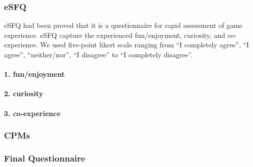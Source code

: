 \subsubsection{eSFQ}
eSFQ\cite{eSFQ} had been proved that it is a questionnaire for rapid assessment of game experience. eSFQ capture the experienced fun/enjoyment, curiosity, and co-experience. We used five-point likert scale ranging from ``I completely agree'', ``I agree'', ``neither/nor'', ``I disagree'' to ``I completely disagree''.

\paragraph{1. fun/enjoyment}

\paragraph{2. curiosity}

\paragraph{3. co-experience}

\subsubsection{CPMs}
\subsubsection{Final Questionnaire}


